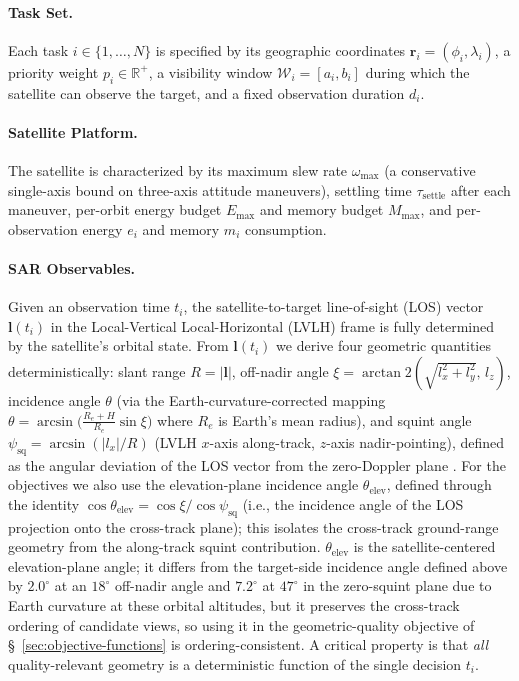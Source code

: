 \documentclass[preprint,12pt,authoryear]{elsarticle}
\begin{document}
\paragraph{Task Set.}
Each task $i \in \{1,\ldots,N\}$ is specified by its geographic coordinates
$\mathbf{r}_i = (\phi_i, \lambda_i)$, a priority weight $p_i \in \mathbb{R}^+$, a visibility window
$\mathcal{W}_i = [a_i, b_i]$ during which the satellite can observe the target,
and a fixed observation duration $d_i$.
\paragraph{Satellite Platform.}
The satellite is characterized by its maximum slew rate $\omega_{\max}$ (a
conservative single-axis bound on three-axis attitude maneuvers), settling
time $\tau_{\text{settle}}$ after each maneuver, per-orbit energy budget
$E_{\max}$ and memory budget $M_{\max}$, and per-observation energy $e_i$
and memory $m_i$ consumption.
\paragraph{SAR Observables.}
Given an observation time $t_i$, the satellite-to-target line-of-sight (LOS)
vector $\mathbf{l}(t_i)$ in the Local-Vertical Local-Horizontal (LVLH) frame
is fully determined by the satellite's orbital state.
From $\mathbf{l}(t_i)$ we derive four geometric quantities deterministically:
slant range $R = |\mathbf{l}|$, off-nadir angle $\xi = \arctan2(\sqrt{l_x^2+l_y^2},\, l_z)$,
incidence angle $\theta$ (via the Earth-curvature-corrected mapping
$\theta = \arcsin\big(\frac{R_e+H}{R_e}\sin\xi\big)$ where $R_e$ is Earth's mean radius), and
squint angle $\psi_{\text{sq}} = \arcsin(|l_x| / R)$ (LVLH $x$-axis
along-track, $z$-axis nadir-pointing), defined as the
angular deviation of the LOS vector from the zero-Doppler plane
\citep{Curlander1991}.
For the objectives we also use the elevation-plane incidence angle
$\theta_{\text{elev}}$, defined through the identity
$\cos\theta_{\text{elev}} = \cos\xi / \cos\psi_{\text{sq}}$
(i.e., the incidence angle of the LOS projection onto the cross-track plane);
this isolates the cross-track ground-range geometry from the along-track
squint contribution. $\theta_{\text{elev}}$ is the satellite-centered
elevation-plane angle; it differs from the target-side incidence angle
defined above by $2.0^\circ$ at an $18^\circ$ off-nadir angle and $7.2^\circ$ at
$47^\circ$ in the zero-squint plane due to Earth curvature at
these orbital altitudes, but it preserves the cross-track ordering of
candidate views, so using it in the geometric-quality objective of
\S~\ref{sec:objective-functions} is ordering-consistent.
A critical property is that \emph{all} quality-relevant geometry
is a deterministic function of the single decision $t_i$.
\end{document}
